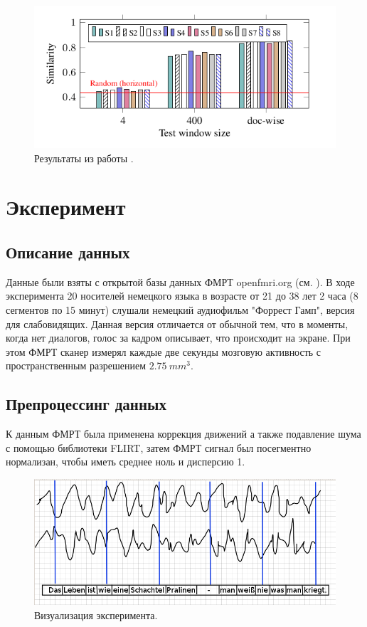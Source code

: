 \documentclass[pdftex,ptm,12pt,a4paper]{report}
\theoremstyle{definition}
\begin{document}
\begin{figure}[h]
\includegraphics[scale=0.7]{images/neural_nets.png}
\centering
\caption{Результаты из работы \cite{qian2016bridging}.}
\label{qian_res}
\end{figure}

\chapter{Эксперимент}

\section{Описание данных}

Данные были взяты с открытой базы данных ФМРТ openfmri.org (см. \citep{hanke2014high}). В ходе эксперимента 20 носителей немецкого языка в возрасте от 21 до 38 лет 2 часа (8 сегментов по 15 минут) слушали немецкий аудиофильм "Форрест Гамп", версия для слабовидящих. Данная версия отличается от обычной тем, что в моменты, когда нет диалогов, голос за кадром описывает, что происходит на экране. При этом ФМРТ сканер измерял каждые две секунды мозговую активность с пространственным разрешением $2.75\ mm^3$.

\section{Препроцессинг данных}

К данным ФМРТ была применена коррекция движений а также подавление шума с помощью библиотеки FLIRT, затем ФМРТ сигнал был посегментно нормализан, чтобы иметь среднее ноль и дисперсию 1. 

\begin{figure}[h]
\includegraphics[scale=0.5]{images/word_forrest.png}
\centering
\caption{Визуализация эксперимента.}
\label{interpolation}
\end{figure}
\end{document}
